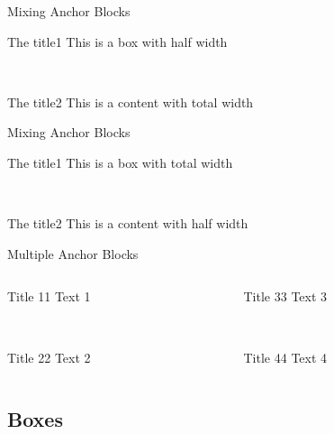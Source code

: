 \documentclass[english,sectioncirclenumberstyle]{ciadbeamer}
\begin{document}
\begin{frame}{Mixing Anchor Blocks}
	\begin{leftanchorblock}[.5\linewidth]{The title}{1}
		This is a box with half width
	\end{leftanchorblock} \\[.5cm]
	\begin{rightanchorblock}{The title}{2}
		This is a content with total width
	\end{rightanchorblock}
\end{frame}

\begin{frame}{Mixing Anchor Blocks \insertcontinuationtext}
	\begin{leftanchorblock}{The title}{1}
		This is a box with total width
	\end{leftanchorblock} \\[.5cm]
	\begin{rightanchorblock}[.5\linewidth]{The title}{2}
		This is a content with half width
	\end{rightanchorblock}
\end{frame}

\begin{frame}{Multiple Anchor Blocks}
	\begin{columns}
		\begin{column}{.5\linewidth}
			\begin{leftanchorblock}{Title 1}{1}
				Text 1
			\end{leftanchorblock} \\[.5cm]
			\begin{leftanchorblock}{Title 2}{2}
				Text 2
			\end{leftanchorblock}
		\end{column}
		\begin{column}{.5\linewidth}
			\begin{rightanchorblock}{Title 3}{3}
				Text 3
			\end{rightanchorblock} \\[.5cm]
			\begin{rightanchorblock}{Title 4}{4}
				Text 4
			\end{rightanchorblock}
		\end{column}
	\end{columns}
\end{frame}


\subsection{Boxes}
\subsectiontableofcontentslide
\end{document}
